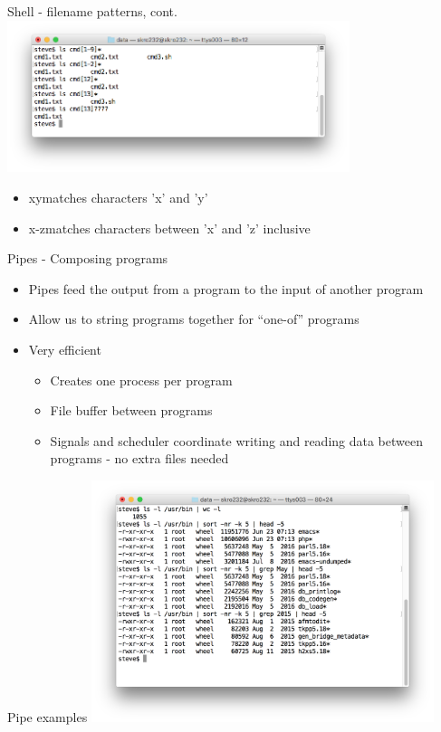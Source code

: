 \documentclass[t]{beamer}
\begin{document}
\begin{frame}{Shell - filename patterns, cont.}
  \includegraphics[width=10cm,scale=0.4]{images/filepat-1.png}
  \begin{itemize}
  \item \lbrack xy\rbrack matches characters 'x' and 'y'
  \item \lbrack x-z\rbrack matches characters between 'x' and 'z' inclusive
  \end{itemize}
  \note{}
\end{frame}

\begin{frame}{Pipes - Composing programs}
  \begin{itemize}
  \item Pipes feed the output from a program to the input of another program
  \item Allow us to string programs together for ``one-of'' programs
  \item Very efficient 
    \begin{itemize}
    \item Creates one process per program
    \item File buffer between programs
    \item Signals and scheduler coordinate writing and reading data
      between programs - no extra files needed
    \end{itemize}
  \end{itemize}
  \note{}
\end{frame}

\begin{frame}{Pipe examples}
  \includegraphics[width=10cm,scale=0.4]{images/pipes.png}
  \note{}
\end{frame}
\end{document}
